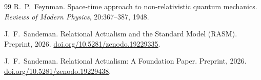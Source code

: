 \documentclass[11pt,a4paper]{article}
\theoremstyle{plain}
\theoremstyle{definition}
\theoremstyle{remark}
\begin{document}
\begin{thebibliography}{99}
R.~P.~Feynman.
\newblock Space-time approach to non-relativistic quantum mechanics.
\newblock \textit{Reviews of Modern Physics}, 20:367--387, 1948.

J.~F.~Sandeman.
\newblock Relational Actualism and the Standard Model ({RASM}).
\newblock Preprint, 2026.
\newblock \href{https://doi.org/10.5281/zenodo.19229335}{doi.org/10.5281/zenodo.19229335}.

J.~F.~Sandeman.
\newblock Relational Actualism: A Foundation Paper.
\newblock Preprint, 2026.
\newblock \href{https://doi.org/10.5281/zenodo.19229438}{doi.org/10.5281/zenodo.19229438}.

\end{thebibliography}
\end{document}
